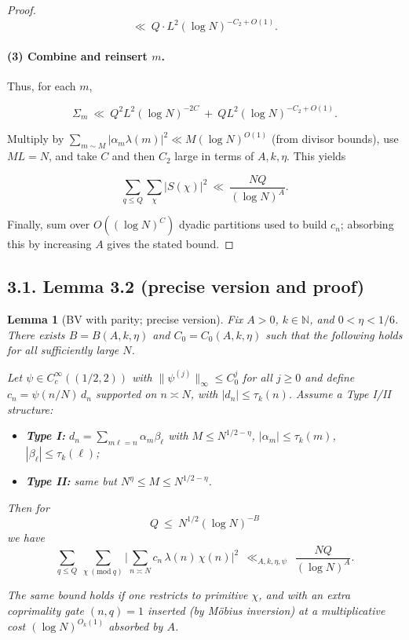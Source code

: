 \documentclass[11pt]{article}
\newtheorem{lemma}{Lemma}[section]
\theoremstyle{definition}
\theoremstyle{remark}
\begin{document}
\begin{proof}
	$$
		\ll\ Q\cdot L^2 (\log N)^{-C_2+O(1)}.
	$$

	\paragraph{(3) Combine and reinsert $m$.}
	Thus, for each $m$,

	$$
		\Sigma_m\ \ll\ Q^2 L^2 (\log N)^{-2C} \ +\ Q L^2 (\log N)^{-C_2+O(1)}.
	$$

	Multiply by $\sum_{m\sim M}|\alpha_m\lambda(m)|^2\ll M(\log N)^{O(1)}$ (from divisor bounds), use $ML=N$, and take $C$ and then $C_2$ large in terms of $A,k,\eta$. This yields

	$$
		\sum_{q\le Q}\sum_{\chi}|S(\chi)|^2\ \ll\ \frac{NQ}{(\log N)^A}.
	$$

	Finally, sum over $O((\log N)^C)$ dyadic partitions used to build $c_n$; absorbing this by increasing $A$ gives the stated bound.
\end{proof}

\subsection*{3.1. Lemma 3.2 (precise version and proof)}

\begin{lemma}[BV with parity; precise version]\label{lem:BV-parity-precise}
	Fix $A>0$, $k\in\mathbb N$, and $0<\eta<1/6$. There exists $B=B(A,k,\eta)$ and $C_0=C_0(A,k,\eta)$ such that the following holds for all sufficiently large $N$.

	Let $\psi\in C_c^\infty((1/2,2))$ with $\|\psi^{(j)}\|_\infty\le C_0^{j}$ for all $j\ge 0$ and define $c_n = \psi(n/N)\,d_n$ supported on $n\asymp N$, with $|d_n|\le \tau_k(n)$. Assume a Type I/II structure:

	\begin{itemize}
		\item \textbf{Type I:} $d_n=\sum_{m\ell=n}\alpha_m\beta_\ell$ with $M\le N^{1/2-\eta}$, $|\alpha_m|\le \tau_k(m)$, $|\beta_\ell|\le \tau_k(\ell)$;
		\item \textbf{Type II:} same but $N^{\eta}\le M\le N^{1/2-\eta}$.
	\end{itemize}

	Then for
	\[
		Q\ \le\ N^{1/2}(\log N)^{-B}
	\]
	we have
	\[
		\sum_{q\le Q}\ \sum_{\chi\ (\mathrm{mod}\ q)}\Bigg|\sum_{n\asymp N} c_n\,\lambda(n)\,\chi(n)\Bigg|^2\ \ \ll_{A,k,\eta,\psi}\ \ \frac{NQ}{(\log N)^A}.
	\]

	The same bound holds if one restricts to primitive $\chi$, and with an extra coprimality gate $(n,q)=1$ inserted (by Möbius inversion) at a multiplicative cost $(\log N)^{O_{k}(1)}$ absorbed by $A$.
\end{lemma}
\end{document}
